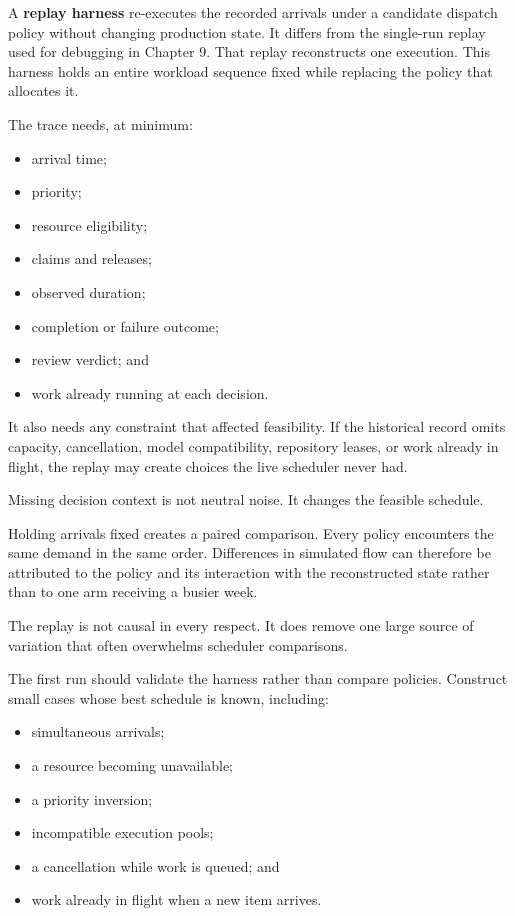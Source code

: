 A \textbf{replay harness} re-executes the recorded arrivals under a candidate dispatch policy without changing production state. It differs from the single-run replay used for debugging in Chapter 9. That replay reconstructs one execution. This harness holds an entire workload sequence fixed while replacing the policy that allocates it.


The trace needs, at minimum:

\begin{itemize}
\tightlist
\item
  arrival time;
\item
  priority;
\item
  resource eligibility;
\item
  claims and releases;
\item
  observed duration;
\item
  completion or failure outcome;
\item
  review verdict; and
\item
  work already running at each decision.
\end{itemize}

It also needs any constraint that affected feasibility. If the historical record omits capacity, cancellation, model compatibility, repository leases, or work already in flight, the replay may create choices the live scheduler never had.

Missing decision context is not neutral noise. It changes the feasible schedule.

Holding arrivals fixed creates a paired comparison. Every policy encounters the same demand in the same order. Differences in simulated flow can therefore be attributed to the policy and its interaction with the reconstructed state rather than to one arm receiving a busier week.

The replay is not causal in every respect. It does remove one large source of variation that often overwhelms scheduler comparisons.


The first run should validate the harness rather than compare policies. Construct small cases whose best schedule is known, including:

\begin{itemize}
\tightlist
\item
  simultaneous arrivals;
\item
  a resource becoming unavailable;
\item
  a priority inversion;
\item
  incompatible execution pools;
\item
  a cancellation while work is queued; and
\item
  work already in flight when a new item arrives.
\end{itemize}

